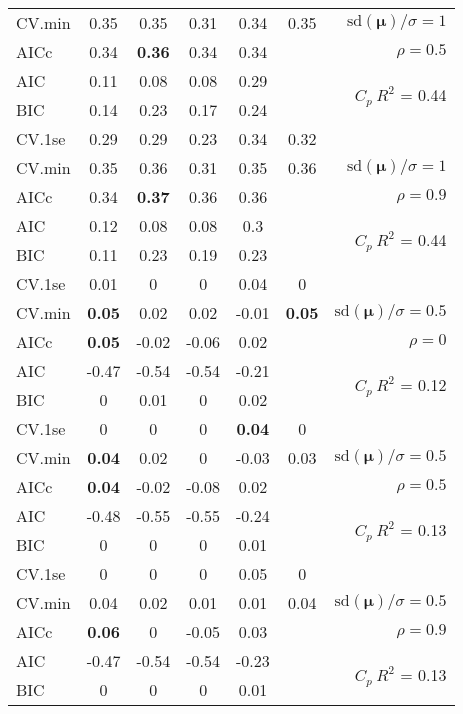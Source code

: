 \documentclass[12pt]{article}
\newcommand{\mr}[1]{\mathrm{#1}}
\newcommand{\bm}[1]{\mathbf{#1}}
\begin{document}
\begin{table}[p]
\begin{center}
\begin{tabular}{l*{5}{c}|r}
CV.min & 0.35 & 0.35 & 0.31 & 0.34 & 0.35 &  $\mr{sd}(\bm{\mu})/\sigma=1$ \\
AICc & 0.34 & {\bf 0.36} & 0.34 & 0.34 & & $\rho=0.5$ \\
AIC & 0.11 & 0.08 & 0.08 & 0.29 & & \multirow{2}{*}{$C_p ~ R^2$ = 0.44} \\
BIC & 0.14 & 0.23 & 0.17 & 0.24 & & \\
 \hline 
CV.1se & 0.29 & 0.29 & 0.23 & 0.34 & 0.32 &\\
CV.min & 0.35 & 0.36 & 0.31 & 0.35 & 0.36 &  $\mr{sd}(\bm{\mu})/\sigma=1$ \\
AICc & 0.34 & {\bf 0.37} & 0.36 & 0.36 & & $\rho=0.9$ \\
AIC & 0.12 & 0.08 & 0.08 & 0.3 & & \multirow{2}{*}{$C_p ~ R^2$ = 0.44} \\
BIC & 0.11 & 0.23 & 0.19 & 0.23 & & \\
 \hline 
CV.1se & 0.01 & 0 & 0 & 0.04 & 0 &\\
CV.min & {\bf 0.05} & 0.02 & 0.02 & -0.01 & {\bf 0.05} &  $\mr{sd}(\bm{\mu})/\sigma=0.5$ \\
AICc & {\bf 0.05} & -0.02 & -0.06 & 0.02 & & $\rho=0$ \\
AIC & -0.47 & -0.54 & -0.54 & -0.21 & & \multirow{2}{*}{$C_p ~ R^2$ = 0.12} \\
BIC & 0 & 0.01 & 0 & 0.02 & & \\
 \hline 
CV.1se & 0 & 0 & 0 & {\bf 0.04} & 0 &\\
CV.min & {\bf 0.04} & 0.02 & 0 & -0.03 & 0.03 &  $\mr{sd}(\bm{\mu})/\sigma=0.5$ \\
AICc & {\bf 0.04} & -0.02 & -0.08 & 0.02 & & $\rho=0.5$ \\
AIC & -0.48 & -0.55 & -0.55 & -0.24 & & \multirow{2}{*}{$C_p ~ R^2$ = 0.13} \\
BIC & 0 & 0 & 0 & 0.01 & & \\
 \hline 
CV.1se & 0 & 0 & 0 & 0.05 & 0 &\\
CV.min & 0.04 & 0.02 & 0.01 & 0.01 & 0.04 &  $\mr{sd}(\bm{\mu})/\sigma=0.5$ \\
AICc & {\bf 0.06} & 0 & -0.05 & 0.03 & & $\rho=0.9$ \\
AIC & -0.47 & -0.54 & -0.54 & -0.23 & & \multirow{2}{*}{$C_p ~ R^2$ = 0.13} \\
BIC & 0 & 0 & 0 & 0.01 & & \\
 \hline 
\end{tabular}
\end{center}
\vspace{-1cm}
\end{table}
\end{document}

